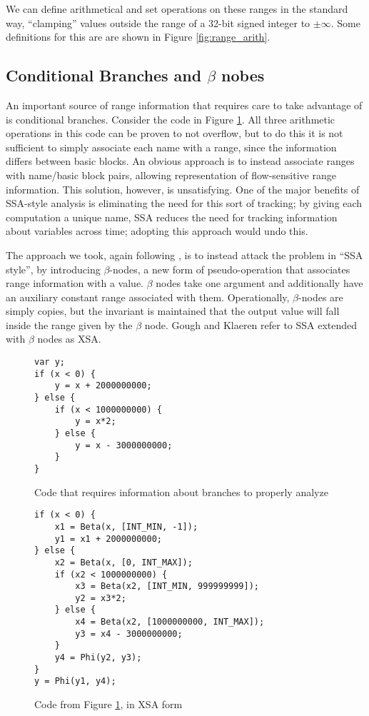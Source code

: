 \documentclass{article}
\begin{document}
We can define arithmetical and set operations on these ranges in the
standard way, ``clamping'' values outside the range of a 32-bit signed
integer to $\pm \infty$. Some definitions for this are are shown in
Figure \ref{fig:range_arith}.

\subsection{Conditional Branches and $\beta$ nobes}

An important source of range information that requires care to take
advantage of is conditional branches. Consider the code in Figure
\ref{fig:branch}. All three arithmetic operations in this code can be
proven to not overflow, but to do this it is not sufficient to simply
associate each name with a range, since the information differs
between basic blocks. An obvious approach is to instead associate
ranges with name/basic block pairs, allowing representation of
flow-sensitive range information. This solution, however, is
unsatisfying. One of the major benefits of SSA-style analysis is
eliminating the need for this sort of tracking; by giving each
computation a unique name, SSA reduces the need for tracking
information about variables across time; adopting this approach would
undo this.

The approach we took, again following \cite{Gough94eliminatingrange},
is to instead attack the problem in ``SSA style'', by introducing
$\beta$-nodes, a new form of pseudo-operation that associates range
information with a value. $\beta$ nodes take one argument and
additionally have an auxiliary constant range associated with
them. Operationally, $\beta$-nodes are simply copies, but the
invariant is maintained that the output value will fall inside the
range given by the $\beta$ node. Gough and Klaeren refer to SSA
extended with $\beta$ nodes as XSA.

\begin{figure}[ht]
\begin{center}
\begin{verbatim}
var y;
if (x < 0) {
    y = x + 2000000000;
} else {
    if (x < 1000000000) {
        y = x*2;
    } else {
        y = x - 3000000000;
    }
}
\end{verbatim}
\end{center}
\caption{Code that requires information about branches to properly analyze}
\label{fig:branch}
\end{figure}

\begin{figure}[ht]
\begin{center}
\begin{verbatim}
if (x < 0) {
    x1 = Beta(x, [INT_MIN, -1]);
    y1 = x1 + 2000000000;
} else {
    x2 = Beta(x, [0, INT_MAX]);
    if (x2 < 1000000000) {
        x3 = Beta(x2, [INT_MIN, 999999999]);
        y2 = x3*2;
    } else {
        x4 = Beta(x2, [1000000000, INT_MAX]);
        y3 = x4 - 3000000000;
    }
    y4 = Phi(y2, y3);
}
y = Phi(y1, y4);
\end{verbatim}
\end{center}
\caption{Code from Figure \ref{fig:branch}, in XSA form}
\label{fig:xsa}
\end{figure}
\end{document}
